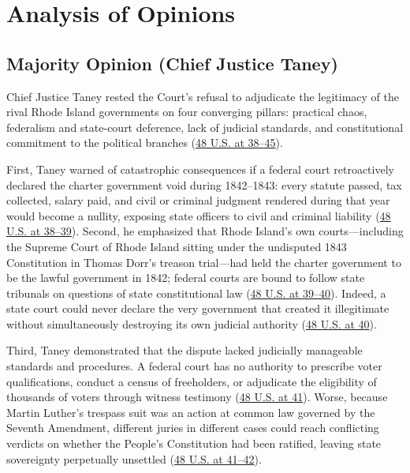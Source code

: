 \documentclass[12pt]{article}
\begin{document}
\section{Analysis of Opinions}

\subsection{Majority Opinion (Chief Justice Taney)}

Chief Justice Taney rested the Court's refusal to adjudicate the legitimacy of the rival Rhode Island governments on four converging pillars: practical chaos, federalism and state-court deference, lack of judicial standards, and constitutional commitment to the political branches (\href{https://supreme.justia.com/cases/federal/us/48/1/}{48 U.S. at 38--45}).

First, Taney warned of catastrophic consequences if a federal court retroactively declared the charter government void during 1842--1843: every statute passed, tax collected, salary paid, and civil or criminal judgment rendered during that year would become a nullity, exposing state officers to civil and criminal liability (\href{https://supreme.justia.com/cases/federal/us/48/1/}{48 U.S. at 38--39}). Second, he emphasized that Rhode Island's own courts---including the Supreme Court of Rhode Island sitting under the undisputed 1843 Constitution in Thomas Dorr's treason trial---had held the charter government to be the lawful government in 1842; federal courts are bound to follow state tribunals on questions of state constitutional law (\href{https://supreme.justia.com/cases/federal/us/48/1/}{48 U.S. at 39--40}). Indeed, a state court could never declare the very government that created it illegitimate without simultaneously destroying its own judicial authority (\href{https://supreme.justia.com/cases/federal/us/48/1/}{48 U.S. at 40}).

Third, Taney demonstrated that the dispute lacked judicially manageable standards and procedures. A federal court has no authority to prescribe voter qualifications, conduct a census of freeholders, or adjudicate the eligibility of thousands of voters through witness testimony (\href{https://supreme.justia.com/cases/federal/us/48/1/}{48 U.S. at 41}). Worse, because Martin Luther's trespass suit was an action at common law governed by the Seventh Amendment, different juries in different cases could reach conflicting verdicts on whether the People's Constitution had been ratified, leaving state sovereignty perpetually unsettled (\href{https://supreme.justia.com/cases/federal/us/48/1/}{48 U.S. at 41--42}).
\end{document}
